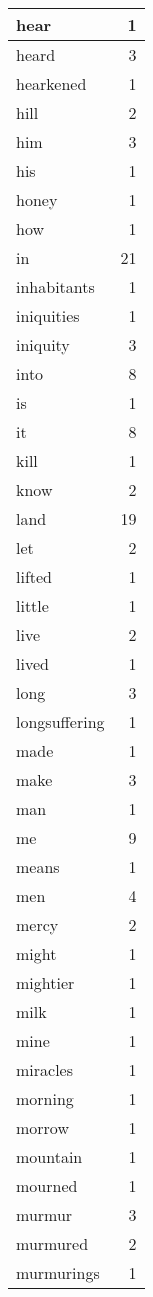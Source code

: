 \begin{center}
\begin{longtable}{l|r}
hear & 1 \\ \hline
heard & 3 \\ \hline
hearkened & 1 \\ \hline
hill & 2 \\ \hline
him & 3 \\ \hline
his & 1 \\ \hline
honey & 1 \\ \hline
how & 1 \\ \hline
in & 21 \\ \hline
inhabitants & 1 \\ \hline
iniquities & 1 \\ \hline
iniquity & 3 \\ \hline
into & 8 \\ \hline
is & 1 \\ \hline
it & 8 \\ \hline
kill & 1 \\ \hline
know & 2 \\ \hline
land & 19 \\ \hline
let & 2 \\ \hline
lifted & 1 \\ \hline
little & 1 \\ \hline
live & 2 \\ \hline
lived & 1 \\ \hline
long & 3 \\ \hline
longsuffering & 1 \\ \hline
made & 1 \\ \hline
make & 3 \\ \hline
man & 1 \\ \hline
me & 9 \\ \hline
means & 1 \\ \hline
men & 4 \\ \hline
mercy & 2 \\ \hline
might & 1 \\ \hline
mightier & 1 \\ \hline
milk & 1 \\ \hline
mine & 1 \\ \hline
miracles & 1 \\ \hline
morning & 1 \\ \hline
morrow & 1 \\ \hline
mountain & 1 \\ \hline
mourned & 1 \\ \hline
murmur & 3 \\ \hline
murmured & 2 \\ \hline
murmurings & 1 \\ \hline

\end{longtable}
\end{center}
